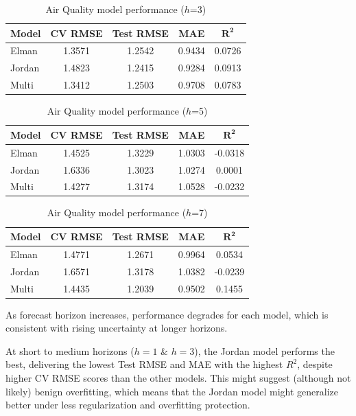 \documentclass[conference]{IEEEtran}
\begin{document}
\begin{table}[H]
\centering
\caption{Air Quality model performance ($h$=3)}
\label{tab:aq_h3}
\begin{tabular}{lcccc}
\toprule
\textbf{Model} & \textbf{CV RMSE} & \textbf{Test RMSE} & \textbf{MAE} & \(\mathbf{R^2}\) \\
\midrule
Elman  & 1.3571 & 1.2542 & 0.9434 & 0.0726 \\
Jordan & 1.4823 & 1.2415 & 0.9284 & 0.0913 \\
Multi  & 1.3412 & 1.2503 & 0.9708 & 0.0783 \\
\bottomrule
\end{tabular}
\end{table}

\begin{table}[H]
\centering
\caption{Air Quality model performance ($h$=5)}
\label{tab:aq_h5}
\begin{tabular}{lcccc}
\toprule
\textbf{Model} & \textbf{CV RMSE} & \textbf{Test RMSE} & \textbf{MAE} & \(\mathbf{R^2}\) \\
\midrule
Elman  & 1.4525 & 1.3229 & 1.0303 & -0.0318 \\
Jordan & 1.6336 & 1.3023 & 1.0274 & 0.0001 \\
Multi  & 1.4277 & 1.3174 & 1.0528 & -0.0232 \\
\bottomrule
\end{tabular}
\end{table}

\begin{table}[H]
\centering
\caption{Air Quality model performance ($h$=7)}
\label{tab:aq_h7}
\begin{tabular}{lcccc}
\toprule
\textbf{Model} & \textbf{CV RMSE} & \textbf{Test RMSE} & \textbf{MAE} & \(\mathbf{R^2}\) \\
\midrule
Elman  & 1.4771 & 1.2671 & 0.9964 & 0.0534 \\
Jordan & 1.6571 & 1.3178 & 1.0382 & -0.0239 \\
Multi  & 1.4435 & 1.2039 & 0.9502 & 0.1455 \\
\bottomrule
\end{tabular}
\end{table}

As forecast horizon increases, performance degrades for each model, which is consistent with rising uncertainty at longer horizons.

At short to medium horizons ($h=1$ \& $h=3$), the Jordan model performs the best, delivering the lowest Test RMSE and MAE with the highest $R^2$, despite higher CV RMSE scores than the other models. This might suggest (although not likely) benign overfitting, which means that the Jordan model might generalize better under less regularization and overfitting protection.
\end{document}
